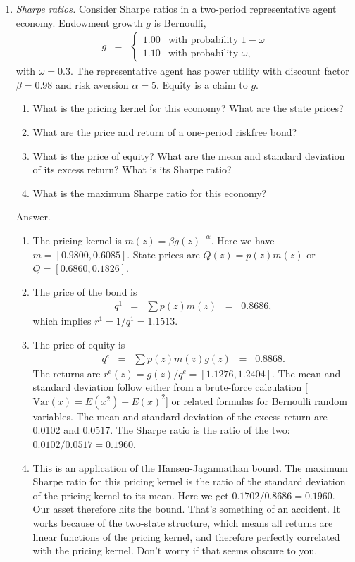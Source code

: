 \documentclass[11pt]{article}
\begin{document}
\begin{enumerate}
\item {\it Sharpe ratios.\/}
Consider Sharpe ratios in a two-period representative agent economy.
Endowment growth $g$ is Bernoulli,
\begin{eqnarray*}
    g &=&
        \left\{
        \begin{array}{ll}
            1.00    &  \mbox{with probability } 1-\omega \\
            1.10    &  \mbox{with probability } \omega ,
        \end{array}
        \right.
\end{eqnarray*}
with $\omega = 0.3$.
The representative agent has power utility with discount factor $\beta = 0.98$
and risk aversion $\alpha = 5$.
Equity is a claim to $g$.
%
\begin{enumerate}
\item What is the pricing kernel for this economy?
What are the state prices?
\item What are the price and return of a one-period riskfree bond?
\item What is the price of equity?
What are the mean and standard deviation of its excess return?
What is its Sharpe ratio?
\item What is the maximum Sharpe ratio for this economy?
\end{enumerate}
%
Answer.
\begin{enumerate}
\item The pricing kernel is $m(z) = \beta g(z)^{-\alpha} $.
Here we have $ m = [0.9800, 0.6085] $.
State prices are $Q(z) = p(z) m(z) $ or
$ Q = [ 0.6860, 0.1826]$.
\item The price of the bond is
\begin{eqnarray*}
    q^1 &=& \sum p(z) m(z) \;\;=\;\; 0.8686,
\end{eqnarray*}
which implies $r^1 = 1/q^1 = 1.1513$.
\item The price of equity is
\begin{eqnarray*}
    q^e &=& \sum p(z) m(z) g(z) \;\;=\;\; 0.8868 .
\end{eqnarray*}
The returns are $r^e(z) = g(z)/q^e =  [1.1276, 1.2404]$.
The mean and standard deviation follow either from
a brute-force calculation [$ \mbox{Var}(x) = E(x^2) - E(x)^2$]
or related formulas for Bernoulli random variables.
The mean and standard deviation of the excess return are
0.0102 and 0.0517.
The Sharpe ratio is the ratio of the two:  $0.0102/0.0517 = 0.1960$.
\item This is an application of the Hansen-Jagannathan bound.
The maximum Sharpe ratio for this pricing kernel is the ratio
of the standard deviation of the pricing kernel to its mean.
Here we get $0.1702/0.8686 = 0.1960$.
Our asset therefore hits the bound.
That's something of an accident.
It works because of the two-state structure,
which means all returns are linear functions of the pricing kernel,
and therefore perfectly correlated with the pricing kernel.
Don't worry if that seems obscure to you.
\end{enumerate}


\end{enumerate}
\end{document}
